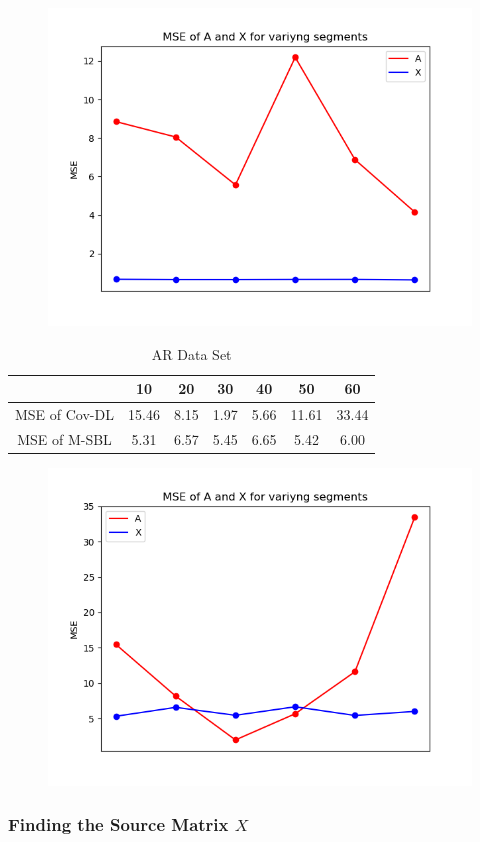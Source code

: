 \begin{figure}[H]
\centering
\includegraphics[scale=0.5]{figures/chapter6/Mix_Error_vary_seg_m8_k16_L1000.png}
\label{fig:seg_mix}
\caption{}
\end{figure}
\noindent

\begin{table}[H]
\centering
\begin{tabular}{|c|c|c|c|c|c|c|}
\hline 
 & 10 & 20 & 30 & 40 & 50 & 60 \\ 
\hline 
MSE of Cov-DL & 15.46 & 8.15 & 1.97 & 5.66 & 11.61 & 33.44 \\ 
\hline 
MSE of M-SBL  & 5.31 & 6.57 & 5.45 & 6.65  & 5.42 & 6.00 \\ 
\hline
\end{tabular} 
\caption{AR Data Set}
\end{table}

\begin{figure}[H]
\centering
\includegraphics[scale=0.5]{figures/chapter6/AR_Error_vary_seg_m8_k16_L1000.png}
\label{fig:seg_AR}
\caption{}
\end{figure}
\noindent

\subsubsection{Finding the Source Matrix $X$}